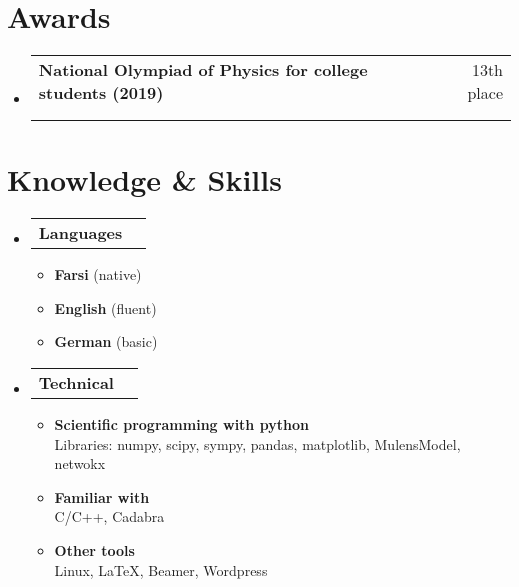 \documentclass[letterpaper,11pt]{article}
\makeatletter
\newcommand{\resumeItem}[1]{
  \item\small{
    {#1 \vspace{-2pt}}
  }
}
\newcommand{\resumeProjectHeading}[2]{
    \item
    \begin{tabular*}{0.97\textwidth}{l@{\extracolsep{\fill}}r}
      \small#1 & #2 \\
    \end{tabular*}\vspace{-7pt}
}
\newcommand{\resumeSubHeadingListStart}{\begin{itemize}[leftmargin=0.15in, label={}]}
\newcommand{\resumeSubHeadingListEnd}{\end{itemize}}
\newcommand{\resumeItemListStart}{\begin{itemize}}
\newcommand{\resumeItemListEnd}{\end{itemize}\vspace{-5pt}}
\makeatother
\begin{document}
\section{Awards}
\resumeSubHeadingListStart

	\resumeProjectHeading
	{\textbf{National Olympiad of Physics for college students (2019)}}{13th place\\\\}

\resumeSubHeadingListEnd


\section{Knowledge \& Skills}
\resumeSubHeadingListStart
	\resumeProjectHeading
	{\textbf{Languages}}{}

	\resumeItemListStart
		\resumeItem{\textbf{Farsi} (native)}
		\resumeItem{\textbf{English} (fluent)}
		\resumeItem{\textbf{German} (basic)}

	\resumeItemListEnd
	
	\resumeProjectHeading
		{\textbf{Technical}}{}
	
		\resumeItemListStart
		\resumeItem{\textbf{Scientific programming with python}\\\qquad Libraries: numpy, scipy, sympy, pandas, matplotlib, MulensModel, netwokx}
		\resumeItem{\textbf{Familiar with}\\\qquad C/C++, Cadabra}
		\resumeItem{\textbf{Other tools}\\\qquad Linux, \LaTeX, Beamer, Wordpress}
	
	\resumeItemListEnd

\resumeSubHeadingListEnd


\end{document}
